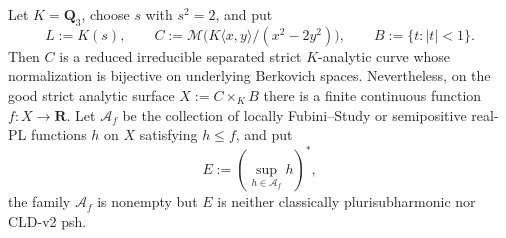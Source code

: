 \begin{proposition}
\label{prop:p031-nonsplit-node-open-disc-envelope-obstruction}
Let \(K=\mathbf Q_3\), choose \(s\) with \(s^2=2\), and put
\[
 L:=K(s),\qquad
 C:=\mathcal M\bigl(K\langle x,y\rangle/(x^2-2y^2)\bigr),
 \qquad B:=\{t:|t|<1\}.
\]
Then \(C\) is a reduced irreducible separated strict \(K\)-analytic curve
whose normalization is bijective on underlying Berkovich spaces.  Nevertheless,
on the good strict analytic surface \(X:=C\times_K B\) there is a finite
continuous function \(f:X\to\mathbf R\).  Let \(\mathcal A_f\) be the
collection of locally Fubini--Study or semipositive real-PL functions \(h\)
on \(X\) satisfying \(h\leq f\), and put
\[
 E:=\left(\sup_{h\in\mathcal A_f}h\right)^*,
\]
the family \(\mathcal A_f\) is nonempty but \(E\) is neither classically
plurisubharmonic nor CLD-v2 psh.
\end{proposition}
